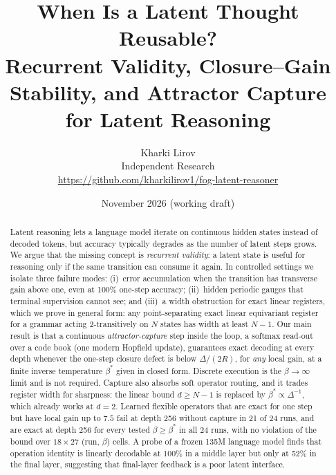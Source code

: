 \documentclass[11pt]{article}
\title{\textbf{When Is a Latent Thought Reusable?}\\[2pt]
\large Recurrent Validity, Closure--Gain Stability, and Attractor Capture\\ for Latent Reasoning}
\author{Kharki Lirov\\ \small Independent Research\\ \small\url{https://github.com/kharkilirov1/fog-latent-reasoner}}
\date{November 2026 \quad (working draft)}
\theoremstyle{definition}
\theoremstyle{remark}
\begin{document}
\maketitle

\begin{center}
\end{center}

\begin{abstract}
Latent reasoning lets a language model iterate on continuous hidden states instead of decoded
tokens, but accuracy typically degrades as the number of latent steps grows. We argue that the
missing concept is \emph{recurrent validity}: a latent state is useful for reasoning only if the
same transition can consume it again. In controlled settings we isolate three failure modes:
(i)~error accumulation when the transition has transverse gain above one, even at 100\%
one-step accuracy; (ii)~hidden periodic gauges that terminal supervision cannot see; and
(iii)~a width obstruction for exact linear registers, which we prove in general form: any
point-separating exact linear equivariant register for a grammar acting 2-transitively on $N$
states has width at least $N-1$. Our main result is that a continuous \emph{attractor-capture}
step inside the loop, a softmax read-out over a code book (one modern Hopfield update),
guarantees exact decoding at every depth whenever the one-step closure defect is below
$\Delta/(2R)$, for \emph{any} local gain, at a finite inverse temperature $\beta^*$ given in closed
form. Discrete execution is the $\beta\to\infty$ limit and is not required. Capture also absorbs
soft operator routing, and it trades register width for sharpness: the linear bound $d\ge N-1$
is replaced by $\beta^*\propto\Delta^{-1}$, which already works at $d=2$. Learned flexible
operators that are exact for one step but have local gain up to $7.5$ fail at depth 256 without
capture in 21 of 24 runs, and are exact at depth 256 for every tested $\beta\ge\beta^*$ in all 24 runs,
with no violation of the bound over $18\times 27$ (run, $\beta$) cells. A probe of a frozen 135M
language model finds that operation identity is linearly decodable at 100\% in a middle layer but
only at 52\% in the final layer, suggesting that final-layer feedback is a poor latent interface.
\end{abstract}
\end{document}
